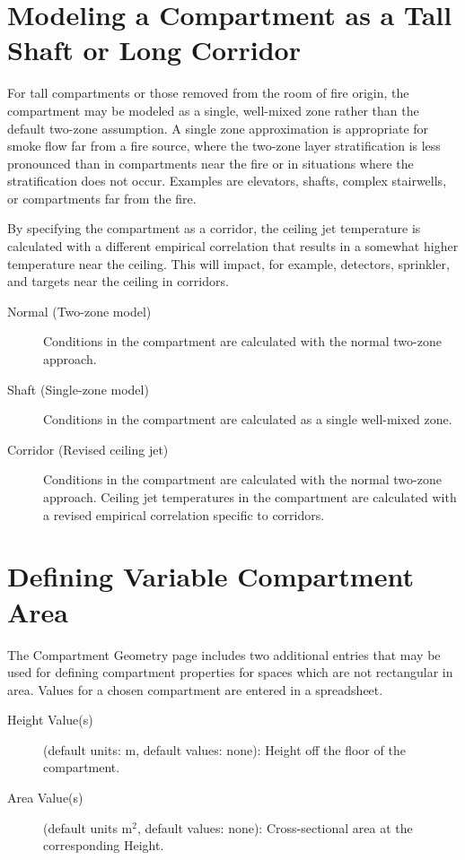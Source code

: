 \section{Modeling a Compartment as a Tall Shaft or Long Corridor}
\label{info:COMP3}
For tall compartments or those removed from the room of fire origin, the compartment may be modeled as a single, well-mixed zone rather than the default two-zone assumption. A single zone approximation is appropriate for smoke flow far from a fire source, where the two-zone layer stratification is less pronounced than in compartments near the fire or in situations where the stratification does not occur. Examples are elevators, shafts, complex stairwells, or compartments far from the fire.

By specifying the compartment as a corridor, the ceiling jet temperature is calculated with a different empirical correlation that results in a somewhat higher temperature near the ceiling.  This will impact, for example, detectors, sprinkler, and targets near the ceiling in corridors.

\begin{description}
\item[Normal (Two-zone model)] Conditions in the compartment are calculated with the normal two-zone approach.

\item[Shaft (Single-zone model)] Conditions in the compartment are calculated as a single well-mixed zone.

\item[Corridor (Revised ceiling jet)] Conditions in the compartment are calculated with the normal two-zone approach. Ceiling jet temperatures in the compartment are calculated with a revised empirical correlation specific to corridors.
\end{description}




\section{Defining Variable Compartment Area}
\label{info:COMP4}
The Compartment Geometry page includes two additional entries that may be used for defining compartment properties for spaces which are not rectangular in area.  Values for a chosen compartment are entered in a spreadsheet.
\begin{description}
\item[Height Value(s)] (default units: m, default values: none): Height off the floor of the compartment.
\item[Area Value(s)] (default units m$^2$, default values: none): Cross-sectional area at the corresponding Height.
\end{description}

